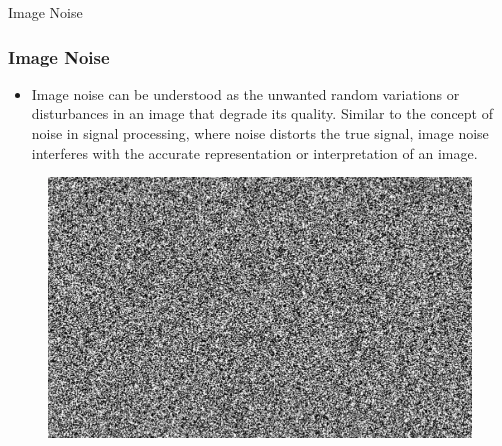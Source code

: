 \documentclass{beamer}
\begin{document}
\begin{frame}[t]{Image Noise}
 \frametitle{Image Noise}
    \begin{itemize}
        \item Image noise can be understood as the unwanted random variations or disturbances in an image that degrade its quality. Similar to the concept of noise in signal processing, where noise distorts the true signal, image noise interferes with the accurate representation or interpretation of an image. 
    \end{itemize}
    \begin{figure}
        \begin{columns}[onlytextwidth]
            \begin{column}{0.45\textwidth}
                \centering
                \includegraphics[width=\linewidth]{img/noise.png}
               

\end{column}
\end{columns}
\end{figure}
\end{frame}
\end{document}

